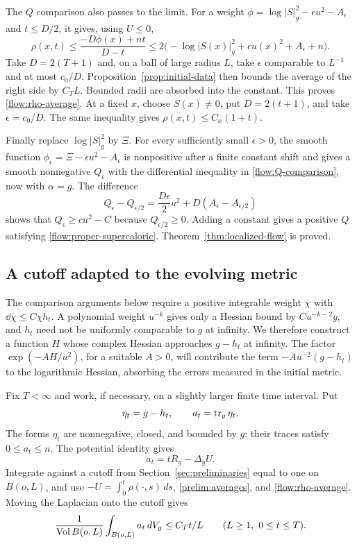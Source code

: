 The $Q$ comparison also passes to the limit.  For a weight
$\phi=\log|S|_g^2-\epsilon u^2-A_\epsilon$ and $t\le D/2$, it gives,
using $U\le0$,
\begin{equation}\label{flow:rho-pointwise}
 \rho(x,t)\le
 \frac{-D\phi(x)+nt}{D-t}
 \le2\bigl(-\log|S(x)|_g^2+\epsilon u(x)^2+A_\epsilon+n\bigr).
\end{equation}
Take $D=2(T+1)$ and, on a ball of large radius $L$, take
$\epsilon$ comparable to $L^{-1}$ and at most $c_0/D$.
Proposition~\ref{prop:initial-data} then bounds the average of the
right side by $C_TL$.  Bounded radii are absorbed into the constant.
This proves \eqref{flow:rho-average}.  At a fixed $x$, choose $S(x)\ne0$,
put $D=2(t+1)$, and take $\epsilon=c_0/D$.  The same inequality gives
$\rho(x,t)\le C_x(1+t)$.

Finally replace $\log|S|_g^2$ by $\Xi$.  For every sufficiently small
$\epsilon>0$, the smooth function
$\phi_\epsilon=\Xi-\epsilon u^2-A_\epsilon$ is nonpositive after
a finite constant shift and gives a smooth nonnegative $Q_\epsilon$
with the differential inequality in \eqref{flow:Q-comparison}, now
with $\alpha=g$.  The difference
\[
 Q_\epsilon-Q_{\epsilon/2}
 =\frac{D\epsilon}{2}u^2+D(A_\epsilon-A_{\epsilon/2})
\]
shows that $Q_\epsilon\ge c u^2-C$ because
$Q_{\epsilon/2}\ge0$.  Adding a constant gives a positive $Q$
satisfying \eqref{flow:proper-supercaloric}.  Theorem~\ref{thm:localized-flow}
is proved.

\subsection{A cutoff adapted to the evolving metric}

The comparison arguments below require a positive integrable weight
$\chi$ with $\dd\chi\le C\chi h_t$.  A polynomial weight $u^{-k}$
gives only a Hessian bound by $Cu^{-k-2}g$, and $h_t$ need not be
uniformly comparable to $g$ at infinity.  We therefore construct a
function $H$ whose complex Hessian approaches $g-h_t$ at infinity.
The factor $\exp(-AH/u^2)$, for a suitable $A>0$, will contribute
the term $-Au^{-2}(g-h_t)$ to the logarithmic Hessian, absorbing
the errors measured in the initial metric.

Fix $T<\infty$ and work, if necessary, on a slightly larger finite
time interval.  Put
\[
 \eta_t=g-h_t,
 \qquad a_t=\operatorname{tr}_g\eta_t.
\]
The forms $\eta_t$ are nonnegative, closed, and bounded by $g$;
their traces satisfy $0\le a_t\le n$.
The potential identity gives
\[
 a_t=tR_g-\Delta_gU.
\]
Integrate against a cutoff from Section~\ref{sec:preliminaries} equal
to one on $B(o,L)$, and use
$-U=\int_0^t\rho(\cdot,s)\,ds$,
\eqref{prelim:averages}, and \eqref{flow:rho-average}.  Moving the
Laplacian onto the cutoff gives
\begin{equation}\label{flow:eta-average}
 \frac{1}{\operatorname{Vol} B(o,L)}\int_{B(o,L)}a_t\,dV_g
 \le C_Tt/L\qquad(L\ge1,\ 0\le t\le T).
\end{equation}

